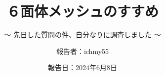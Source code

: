 %
\title{６面体メッシュのすすめ}
\subtitle{～ 先日した質問の件、自分なりに調査しました ～}
%
%
%
\date[Jun.8th,2024]{報告日：2024年6月8日}
\author[ichmy55]{報告者：ichmy55}
\subject{Usage example of PrePoMax}
